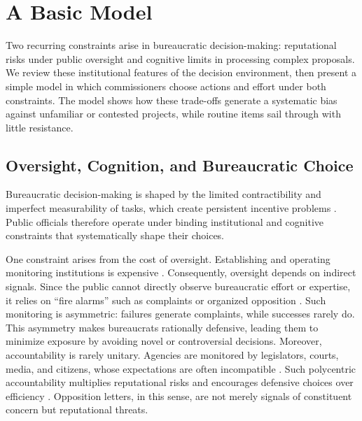 \section{A Basic Model} \label{sec_model}

Two recurring constraints arise in bureaucratic decision-making: reputational risks under public oversight and cognitive limits in processing complex proposals. We review these institutional features of the decision environment, then present a simple model in which commissioners choose actions and effort under both constraints. The model shows how these trade-offs generate a systematic bias against unfamiliar or contested projects, while routine items sail through with little resistance.

\subsection{Oversight, Cognition, and Bureaucratic Choice}

Bureaucratic decision-making is shaped by the limited contractibility and imperfect measurability of tasks, which create persistent incentive problems \citep{Dixit2002}. Public officials therefore operate under binding institutional and cognitive constraints that systematically shape their choices.

One constraint arises from the cost of oversight. Establishing and operating monitoring institutions is expensive \citep{HuberShipan2000,DamonteDunlopRadaelli2014}. Consequently, oversight depends on indirect signals. Since the public cannot directly observe bureaucratic effort or expertise, it relies on ``fire alarms'' such as complaints or organized opposition \citep{Prendergast2003}. Such monitoring is asymmetric: failures generate complaints, while successes rarely do. This asymmetry makes bureaucrats rationally defensive, leading them to minimize exposure by avoiding novel or controversial decisions. Moreover, accountability is rarely unitary. Agencies are monitored by legislators, courts, media, and citizens, whose expectations are often incompatible \citep{Black2008,MaggettiPapadopoulos2018}. Such polycentric accountability multiplies reputational risks and encourages defensive choices over efficiency \citep{CarpenterKrause2012,GiladMaorBloom2015,BusuiocLodge2016}. Opposition letters, in this sense, are not merely signals of constituent concern but reputational threats.

